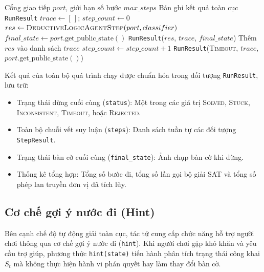 \begin{algorithm}[H]
\caption{Vòng lặp giải toàn cục \textsc{DeductiveLogicAgentRun}}
\label{alg:deductive-agent-run}
\begin{algorithmic}[1]
\REQUIRE Cổng giao tiếp $port$, giới hạn số bước $max\_steps$
\ENSURE Bản ghi kết quả toàn cục \texttt{RunResult}
\STATE $trace \leftarrow [\,]$; $step\_count \leftarrow 0$
    \STATE $res \leftarrow \textsc{DeductiveLogicAgentStep}(port, classifier)$
        \STATE $final\_state \leftarrow port.\text{get\_public\_state}()$
        \RETURN \texttt{RunResult}($res$, $trace$, $final\_state$)
    \ENDIF
    \STATE Thêm $res$ vào danh sách $trace$
    \STATE $step\_count \leftarrow step\_count + 1$
\ENDWHILE
\RETURN \texttt{RunResult}(\textsc{Timeout}, $trace$, $port.\text{get\_public\_state}()$)
\end{algorithmic}
\end{algorithm}

Kết quả của toàn bộ quá trình chạy được chuẩn hóa trong đối tượng \texttt{RunResult}, lưu trữ:
\begin{itemize}
    \item Trạng thái dừng cuối cùng (\texttt{status}): Một trong các giá trị \textsc{Solved}, \textsc{Stuck}, \textsc{Inconsistent}, \textsc{Timeout}, hoặc \textsc{Rejected}.
    \item Toàn bộ chuỗi vết suy luận (\texttt{steps}): Danh sách tuần tự các đối tượng \texttt{StepResult}.
    \item Trạng thái bàn cờ cuối cùng (\texttt{final\_state}): Ảnh chụp bàn cờ khi dừng.
    \item Thống kê tổng hợp: Tổng số bước đi, tổng số lần gọi bộ giải SAT và tổng số phép lan truyền đơn vị đã tích lũy.
\end{itemize}

\subsection{Cơ chế gợi ý nước đi (Hint)}
\label{subsec:hint-mechanism}

Bên cạnh chế độ tự động giải toàn cục, tác tử cung cấp chức năng hỗ trợ người chơi thông qua cơ chế gợi ý nước đi (\texttt{hint}). Khi người chơi gặp khó khăn và yêu cầu trợ giúp, phương thức \texttt{hint(state)} tiến hành phân tích trạng thái công khai $S_t$ mà không thực hiện hành vi phán quyết hay làm thay đổi bàn cờ.

